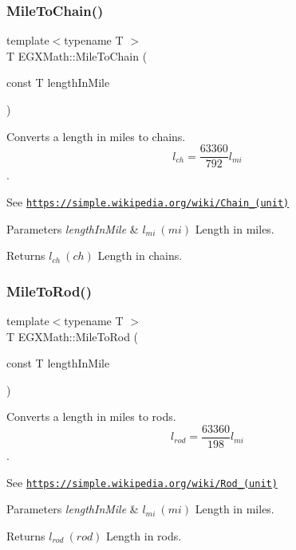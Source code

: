 \subsubsection{\texorpdfstring{Mile\+To\+Chain()}{MileToChain()}}
{\footnotesize\ttfamily template$<$typename T $>$ \\
T E\+G\+X\+Math\+::\+Mile\+To\+Chain (\begin{DoxyParamCaption}\item[{const T}]{length\+In\+Mile }\end{DoxyParamCaption})}



Converts a length in miles to chains. \[ l_{ch}= \frac{63360}{792} l_{mi} \]. 

See \href{https://simple.wikipedia.org/wiki/Chain_(unit)}{\tt https\+://simple.\+wikipedia.\+org/wiki/\+Chain\+\_\+(unit)} 
\begin{DoxyParams}{Parameters}
{\em length\+In\+Mile} & $ l_{mi}\ (mi)$ Length in miles. \\
\hline
\end{DoxyParams}
\begin{DoxyReturn}{Returns}
$ l_{ch}\ (ch)$ Length in chains. 
\end{DoxyReturn}
\mbox{\label{group___e_g_x_math-_conversions-_length_conversions-_imperial-_mile-_surveyors_gae7e968004f761942f7d296ef66f1f93a}} 
\subsubsection{\texorpdfstring{Mile\+To\+Rod()}{MileToRod()}}
{\footnotesize\ttfamily template$<$typename T $>$ \\
T E\+G\+X\+Math\+::\+Mile\+To\+Rod (\begin{DoxyParamCaption}\item[{const T}]{length\+In\+Mile }\end{DoxyParamCaption})}



Converts a length in miles to rods. \[ l_{rod}= \frac{63360}{198} l_{mi} \]. 

See \href{https://simple.wikipedia.org/wiki/Rod_(unit)}{\tt https\+://simple.\+wikipedia.\+org/wiki/\+Rod\+\_\+(unit)} 
\begin{DoxyParams}{Parameters}
{\em length\+In\+Mile} & $ l_{mi}\ (mi)$ Length in miles. \\
\hline
\end{DoxyParams}
\begin{DoxyReturn}{Returns}
$ l_{rod}\ (rod)$ Length in rods. 
\end{DoxyReturn}
